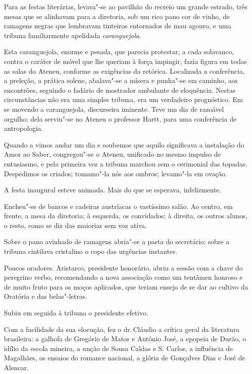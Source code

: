 Para as festas literárias, levava"-se ao pavilhão do recreio um grande
estrado, três mesas que se alinhavam para a diretoria, sob um rico pano
cor de vinho, de ramagens negras que lembravam tinteiros entornados de
mau agouro, e uma tribuna familiarmente apelidada \textit{caranguejola}. 

Esta caranguejola, enorme e pesada, que parecia protestar, a cada solavanco,
contra o caráter de móvel que lhe queriam à força impingir, fazia
figura em todas as salas do Ateneu, conforme as exigências da retórica.
Localizada a conferência, a preleção, a prática solene, abalava"-se a
mísera e punha"-se em caminho, aos encontrões, seguindo o fadário de
mostrador ambulante de eloquência. Nestas circunstâncias não era uma
simples tribuna, era um verdadeiro prognóstico. Em se movendo a
caranguejola, discurseira iminente. Teve um dia de razoável orgulho;
dela serviu"-se no Ateneu o professor Hartt, para uma conferência de
antropologia. 

Quando a vimos andar um dia e soubemos que aquilo
significava a instalação do Amor ao Saber, congregou"-se o Ateneu,
unificado no mesmo impulso de entusiasmo, e pela primeira vez a tribuna
marchou sem o cerimonial das topadas. Despedimos os criados;
tomamo"-la nós aos ombros; levamo"-la em ovação. 

A festa inaugural
esteve animada. Mais do que se esperava, infelizmente. 

Encheu"-se de
bancos e cadeiras austríacas o vastíssimo salão. Ao centro, em frente,
a mesa da diretoria; à esquerda, os convidados; à direita, os outros
alunos, o resto, como se diz das maiorias sem voz ativa. 

Sobre o pano
avinhado de ramagens abria"-se a pasta do secretário; sobre a tribuna
cintilava cristalino o copo das urgências instantes. 

Poucos oradores.
Aristarco, presidente honorário, abriu a sessão com a chave do
peregrino verbo, recomendando a nova associação como um tentâmen
honroso e de muito fruto para os moços aplicados, que teriam ensejo de
se dar ao cultivo da Oratória e das belas"-letras. 

Subiu em seguida à
tribuna o presidente efetivo. 

Com a facilidade da sua elocução, fez o
dr.\,Cláudio a crítica geral da literatura brasileira: a galhofa de
Gregório de Matos e Antônio José, a epopeia de Durão, o idílio da
escola mineira, a unção de Sousa Caldas e S. Carlos, a influência de
Magalhães, os ensaios do romance nacional, a glória de Gonçalves Dias e
José de Alencar. 

